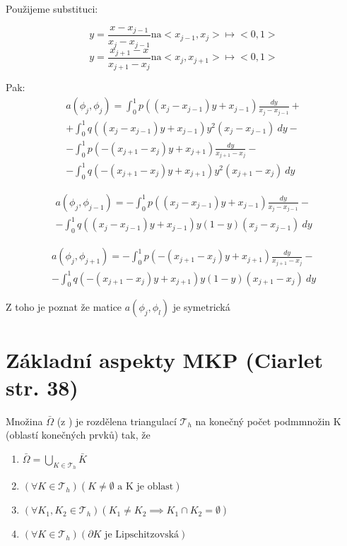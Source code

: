 \documentclass[../main.tex]{subfiles}
\begin{document}
\begin{example}[MKP v 1D]
Použijeme substituci: 

\begin{equation}
    y = \frac{x - x_{j-1}}{x_j - x_{j-1}} \text{na} <x_{j-1}, x_j> \mapsto <0,1>
\end{equation}
\begin{equation}
    y = \frac{x_{j+1} - x}{x_{j+1} - x_{j}} \text{na} <x_{j}, x_{j+1}> \mapsto <0,1>
\end{equation}

Pak: 
\begin{multline}
    a(\phi_j, \phi_j) = \int_0^1 p((x_j - x_{j-1})y + x_{j-1}) \frac{dy}{x_j - x_{j-1}} +\\+ \int_0^1 q((x_j - x_{j-1})y + x_{j-1}) y^2 (x_j - x_{j-1}) \ dy -\\- \int_0^1 p(-(x_{j+1} - x_j)y + x_{j+1}) \frac{dy}{ x_{j+1} - x_j} -\\- \int_0^1 q(-(x_{j+1} - x_j)y + x_{j+1}) y^2 (x_{j+1} - x_j) \ dy
\end{multline}

\begin{multline}
    a(\phi_j, \phi_{j-1}) = - \int_0^1 p((x_j - x_{j-1})y + x_{j-1}) \frac{dy}{x_j - x_{j-1}} -\\- \int_0^1 q((x_j - x_{j-1})y + x_{j-1}) y(1-y) (x_j - x_{j-1}) \ dy
\end{multline}

\begin{multline}
    a(\phi_j, \phi_{j+1}) = - \int_0^1 p(-(x_{j+1} - x_j)y + x_{j+1}) \frac{dy}{ x_{j+1} - x_j} -\\- \int_0^1 q(-(x_{j+1} - x_j)y + x_{j+1}) y(1-y) (x_{j+1} - x_j) \ dy
\end{multline}

Z toho je poznat že matice $a(\phi_j, \phi_l)$ je symetrická
\end{example}

\section{Základní aspekty MKP (Ciarlet str. 38)}
\begin{theorem}[MKP1]
    Množina $\bar{\Omega}$ (z ) je rozdělena triangulací $\mathcal{T}_h$ na konečný počet podmmnožin K (oblastí konečných prvků) tak, že 
    \begin{enumerate}
        \item $\bar{\Omega} = \bigcup_{K\in\mathcal{T}_h} \bar{K}$
        \item $(\forall K  \in \mathcal{T}_h)(K\neq\emptyset \text{ a K je oblast})$
        \item $(\forall K_1, K_2 \in \mathcal{T}_h)(K_1 \neq K_2 \implies K_1 \cap K_2 = \emptyset)$
        \item $(\forall K \in \mathcal{T}_h) (\partial K \text{ je Lipschitzovská} )$
    \end{enumerate}
\end{theorem}
\end{document}
